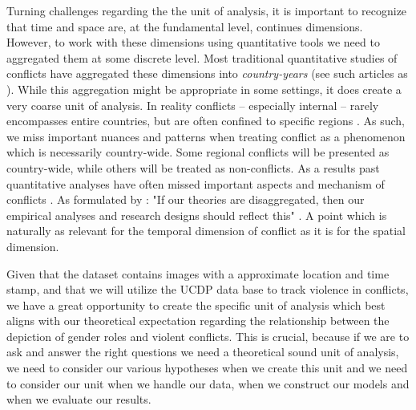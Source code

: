 \documentclass[a4paper]{article}
\begin{document}
Turning challenges regarding the the unit of analysis, it is important to recognize that time and space are, at the fundamental level, continues dimensions. However, to work with these dimensions using quantitative tools we need to aggregated them at some discrete level. Most traditional quantitative studies of conflicts have aggregated these dimensions into \emph{country-years} (see such articles as \cite{Collier_Hoeffler_1998, Fearon_Laitin_2003, Collier_Hoeffler_2004, Fearon_2004, Ross_2004, Fearon_2005, Hegre_Sambanis_2006, Goldstone_2010}). While this aggregation might be appropriate in some settings, it does create a very coarse unit of analysis. In reality conflicts -- especially internal -- rarely encompasses entire countries, but are often confined to specific regions \citep[487]{Cederman_Gleditsch_2009}. As such, we miss important nuances and patterns when treating conflict as a phenomenon which is necessarily country-wide. Some regional conflicts will be presented as country-wide, while others will be treated as non-conflicts. As a results past quantitative analyses have often missed important aspects and mechanism of conflicts \citep{Cederman_Gleditsch_2009, Cederman_Gleditsch_Buhaug_2013}. As formulated by \cite{Cederman_Gleditsch_2009}: "If our theories are disaggregated, then our empirical analyses and research designs should reflect this" \citep[490]{Cederman_Gleditsch_2009}. A point which is naturally as relevant for the temporal dimension of conflict as it is for the spatial dimension.\par 

Given that the dataset contains images with a approximate location and time stamp, and that we will utilize the UCDP data base to track violence in conflicts, we have a great opportunity to create the specific unit of analysis which best aligns with our theoretical expectation regarding the relationship between the depiction of gender roles and violent conflicts. This is crucial, because if we are to ask and answer the right questions we need a theoretical sound unit of analysis, we need to consider our various hypotheses when we create this unit and we need to consider our unit when we handle our data, when we construct our models and when we evaluate our results.\par 
\end{document}
